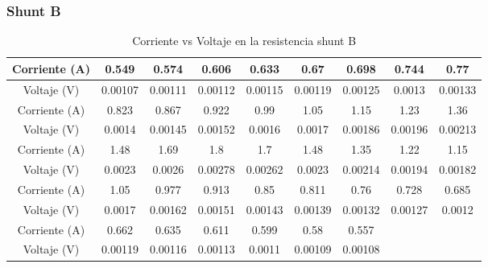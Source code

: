         \subsubsection{Shunt B}    
            \begin{table} [H]
                \begin{center}
                    \begin{tabular}{ |c|c|c|c|c|c|c|c|c| }
                        \hline
                        Corriente (A) & 0.549 & 0.574 & 0.606 & 0.633 & 0.67 & 0.698 & 0.744 & 0.77\\
                        \hline
                        Voltaje (V) & 0.00107 & 0.00111 & 0.00112 & 0.00115 & 0.00119 & 0.00125 & 0.0013 & 0.00133\\
                        \hline
                        \hline
                        Corriente (A) & 0.823 & 0.867 & 0.922 & 0.99 & 1.05 & 1.15 & 1.23 & 1.36\\
                        \hline
                        Voltaje (V) & 0.0014 & 0.00145 & 0.00152 & 0.0016 & 0.0017 & 0.00186 & 0.00196 & 0.00213\\
                        \hline
                        \hline
                        Corriente (A) & 1.48 & 1.69 & 1.8 & 1.7 & 1.48 & 1.35 & 1.22 & 1.15\\
                        \hline
                        Voltaje (V) & 0.0023 & 0.0026 & 0.00278 & 0.00262 & 0.0023 & 0.00214 & 0.00194 & 0.00182\\
                        \hline
                        \hline
                        Corriente (A) & 1.05 & 0.977 & 0.913 & 0.85 & 0.811 & 0.76 & 0.728 & 0.685\\
                        \hline
                        Voltaje (V) & 0.0017 & 0.00162 & 0.00151 & 0.00143 & 0.00139 & 0.00132 & 0.00127 & 0.0012\\
                        \hline
                        \hline
                        Corriente (A) & 0.662 & 0.635 & 0.611 & 0.599 & 0.58 & 0.557\\
                        \hline
                        Voltaje (V) & 0.00119 & 0.00116 & 0.00113 & 0.0011 & 0.00109 & 0.00108\\
                        \hline
                    \end{tabular}
                \end{center}
                \caption{Corriente vs Voltaje en la resistencia shunt B}
                \label{tab:shuntB}
            \end{table}

